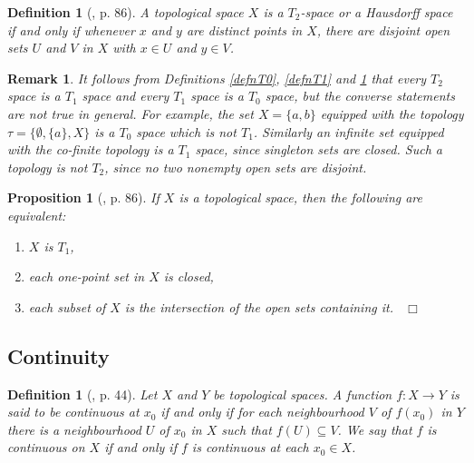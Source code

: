 \documentclass[12pt, oneside]{book}
\newtheorem{proposition}[theorem]{Proposition}
\newtheorem{definition}[theorem]{Definition}
\newtheorem{remark}[theorem]{Remark}
\newcommand{\qed}{\hfill ~$\Box$\\}
\begin{document}
\begin{definition}[\cite{W2}, p. 86]\label{defnT2}
\normalfont
\noindent A topological space $X$ is a $T_2$-{\sl space} or a {\sl Hausdorff} space if and only if whenever $x$ and $y$ are distinct points in $X$, there are disjoint open sets $U$ and $V$ in $X$ with $x \in U$ and $y \in V$.

\end{definition}


\begin{remark} \label{T0T1T2}
\normalfont
\noindent It follows from Definitions \ref{defnT0}, \ref{defnT1} and \ref{defnT2} that 
every $T_2$ space is a $T_1$ space and every $T_1$ space is a $T_0$ space, 
but the converse statements are not true in general. 
\vskip 0.3cm
\noindent For example, the set $X=\{a,b\}$ equipped with the topology $\tau=\{\emptyset, \{a\}, X\}$ is 
a $T_0$ space which is not $T_1$. 
\vskip 0.3cm
\noindent Similarly an infinite set equipped with the co-finite topology is a $T_1$ space, 
since singleton sets are closed. Such a topology is not $T_2$, since no two nonempty 
open sets are disjoint.

\end{remark}

\begin{proposition}[\cite{W2}, p. 86] \label{SeparationEquiv}
\normalfont
\noindent If $X$ is a topological space, then the following are equivalent:
\begin{enumerate}[label=(\alph*)]
\item $X$ is $T_1$,
\item each one-point set in $X$ is closed,
\item each subset of $X$ is the intersection of the open sets containing it. \qed
\end{enumerate}
\end{proposition}

\subsection{Continuity}

\begin{definition}[\cite{W2}, p. 44] \label{defnContinuity}
\normalfont
\noindent Let $X$ and $Y$ be topological spaces. 
A function $f: X \rightarrow Y$ is said to be continuous at $x_0$ if and only if for each neighbourhood $V$ of $f(x_0)$ in $Y$ there is a neighbourhood $U$ of $x_0$ in $X$ such that $f(U) \subseteq V$. 
We say that $f$ is {\sl continuous on} $X$ if and only if $f$ is continuous at each $x_0 \in X$.
\end{definition}
\end{document}

